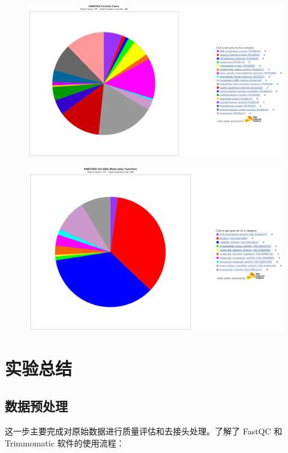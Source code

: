 \documentclass[UTF8]{ctexart}
\begin{document}
\begin{figure}[h]
	\centering
	\includegraphics[width=\textwidth]{img/GO_ProCla.png}
\end{figure}

\begin{figure}[h]
	\centering
	\includegraphics[width=\textwidth]{img/GO_MolFun.png}
\end{figure}

\clearpage

\section{实验总结}

\subsection{数据预处理}

这一步主要完成对原始数据进行质量评估和去接头处理。了解了 FastQC 和 Trimmomatic 软件的使用流程：
\end{document}
